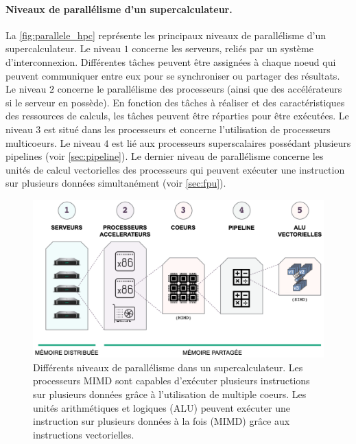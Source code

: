         \paragraph{Niveaux de parallélisme d'un supercalculateur.}
            La \autoref{fig:parallele_hpc} représente les principaux niveaux de parallélisme d'un supercalculateur. Le  niveau $1$ concerne les serveurs, reliés par un système d'interconnexion. Différentes tâches peuvent être assignées à chaque noeud qui peuvent communiquer entre eux pour se synchroniser ou partager des résultats. Le niveau $2$ concerne le parallélisme des processeurs (ainsi que des accélérateurs si le serveur en possède). En fonction des tâches à réaliser et des caractéristiques des ressources de calculs, les tâches peuvent être réparties pour être exécutées. Le niveau $3$ est situé dans les processeurs et concerne l'utilisation de processeurs multicoeurs. Le niveau $4$ est lié aux processeurs superscalaires possédant plusieurs pipelines (voir \autoref{sec:pipeline}). Le dernier niveau de parallélisme concerne les unités de calcul vectorielles des processeurs qui peuvent exécuter une instruction sur plusieurs données simultanément (voir \autoref{sec:fpu}).
            
            \begin{figure}
                \center
                \includegraphics[width=14cm]{images/parallele_hpc.png}
                \caption{\label{fig:parallele_hpc} Différents niveaux de parallélisme dans un supercalculateur. Les processeurs MIMD sont capables d'exécuter plusieurs instructions sur plusieurs données grâce à l'utilisation de multiple coeurs. Les unités arithmétiques et logiques (ALU) peuvent exécuter une instruction sur plusieurs données à la fois (MIMD) grâce aux instructions vectorielles.}
            \end{figure}
            
